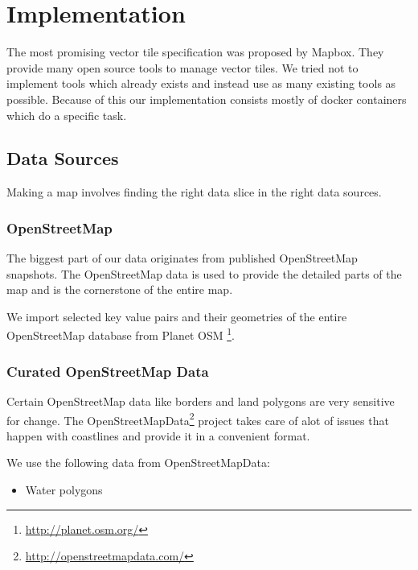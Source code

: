 \chapter{Implementation}\label{implementation}

The most promising vector tile specification was proposed by Mapbox.
They provide many open source tools to manage vector tiles. We tried not to implement tools which already exists and instead use as many existing tools as possible. Because of this our implementation consists mostly of docker containers which do a specific task.

\section{Data Sources}
\label{data-sources}

Making a map involves finding the right data slice in the right
data sources.

\subsection{OpenStreetMap}

The biggest part of our data originates from published OpenStreetMap snapshots. The OpenStreetMap data is used to provide the detailed parts of the map and is the cornerstone of the entire map.

We import selected key value pairs and their geometries of the entire OpenStreetMap database from Planet OSM \footnote{\url{http://planet.osm.org/}}.


\subsection{Curated OpenStreetMap Data}

Certain OpenStreetMap data like borders and land polygons are very sensitive for change.
The OpenStreetMapData\footnote{\url{http://openstreetmapdata.com/}}
project takes care of alot of issues that happen with coastlines
and provide it in a convenient format.

We use the following data from OpenStreetMapData:

\begin{itemize}
\item Water polygons
\end{itemize}

